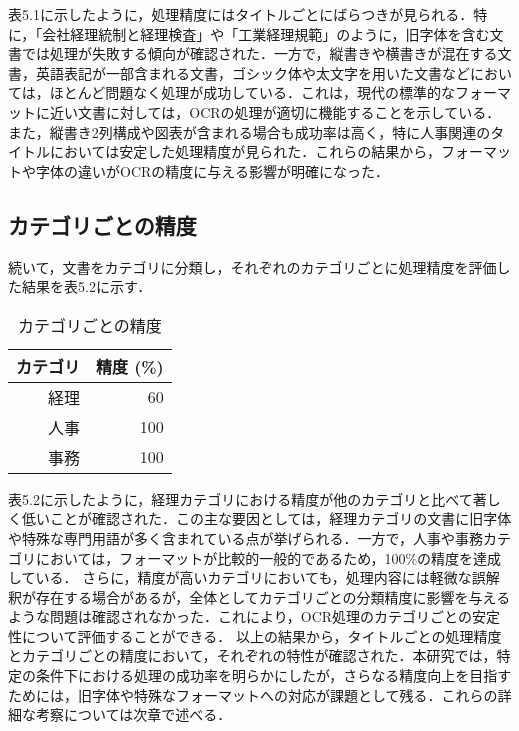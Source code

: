 表5.1に示したように，処理精度にはタイトルごとにばらつきが見られる．特に，「会社経理統制と経理検査」や「工業経理規範」のように，旧字体を含む文書では処理が失敗する傾向が確認された．一方で，縦書きや横書きが混在する文書，英語表記が一部含まれる文書，ゴシック体や太文字を用いた文書などにおいては，ほとんど問題なく処理が成功している．これは，現代の標準的なフォーマットに近い文書に対しては，OCRの処理が適切に機能することを示している．
また，縦書き2列構成や図表が含まれる場合も成功率は高く，特に人事関連のタイトルにおいては安定した処理精度が見られた．これらの結果から，フォーマットや字体の違いがOCRの精度に与える影響が明確になった．

\subsection{カテゴリごとの精度}
\label{subsec:category}

続いて，文書をカテゴリに分類し，それぞれのカテゴリごとに処理精度を評価した結果を表5.2に示す．

\begin{table}[h]
  \begin{center}
  \begin{tabular}{|r|r|}
    \hline
    \textbf{カテゴリ} & \textbf{精度 (\%)} \\ \hline
    経理 & 60 \\ \hline
    人事 & 100 \\ \hline
    事務 & 100 \\ \hline
  \end{tabular}
  \end{center}
  \caption{カテゴリごとの精度}
  \label{tab:category_accuracy}
\end{table}

表5.2に示したように，経理カテゴリにおける精度が他のカテゴリと比べて著しく低いことが確認された．この主な要因としては，経理カテゴリの文書に旧字体や特殊な専門用語が多く含まれている点が挙げられる．一方で，人事や事務カテゴリにおいては，フォーマットが比較的一般的であるため，100\%の精度を達成している．
さらに，精度が高いカテゴリにおいても，処理内容には軽微な誤解釈が存在する場合があるが，全体としてカテゴリごとの分類精度に影響を与えるような問題は確認されなかった．これにより，OCR処理のカテゴリごとの安定性について評価することができる．
以上の結果から，タイトルごとの処理精度とカテゴリごとの精度において，それぞれの特性が確認された．本研究では，特定の条件下における処理の成功率を明らかにしたが，さらなる精度向上を目指すためには，旧字体や特殊なフォーマットへの対応が課題として残る．これらの詳細な考察については次章で述べる．
